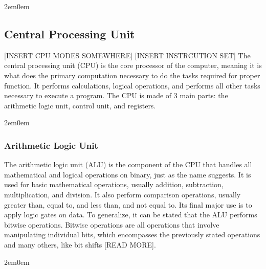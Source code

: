 \documentclass[openany, 12px]{book}
\begin{document}
\begin{adjustwidth}{2em}{0em}
\subsection{Central Processing Unit}
[INSERT CPU MODES SOMEWHERE] [INSERT INSTRCUTION SET]
The central processing unit (CPU) is the core processor of the computer, meaning it is what does the primary computation necessary to do the tasks required for proper function. It performs calculations, logical operations, and performs all other tasks necessary to execute a program. The CPU is made of 3 main parts: the arithmetic logic unit, control unit, and registers.
\begin{adjustwidth}{2em}{0em}
\subsubsection{Arithmetic Logic Unit}
The arithmetic logic unit (ALU) is the component of the CPU that handles all mathematical and logical operations on binary, just as the name suggests. It is used for basic mathematical operations, usually addition, subtraction, multiplication, and division. It also perform comparison operations, usually greater than, equal to, and less than, and not equal to. Its final major use is to apply logic gates on data. To generalize, it can be stated that the ALU performs bitwise operations. Bitwise operations are all operations that involve manipulating individual bits, which encompasses the previously stated operations and many others, like bit shifts [READ MORE].
\end{adjustwidth}

\begin{adjustwidth}{2em}{0em}

\end{adjustwidth}
\end{adjustwidth}
\end{document}
